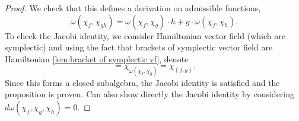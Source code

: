 \begin{proof}
    We check that this defines a derivation on admissible functions,
    \begin{equation}
        \omega(\chi_f, \chi_{gh}) = \omega(\chi_f, \chi_g)\cdot h + g \cdot \omega(\chi_f, \chi_h).
    \end{equation}
    To check the Jacobi identity, we consider Hamiltonian vector field (which are symplectic) and using the fact that brackets of symplectic vector field are Hamiltonian \cref{lem:bracket of symplectic vf}, denote
    \begin{equation}
        [\chi_f, \chi_g] = \chi_{\omega(\chi_f, \chi_g)} = \chi_{\left\{ f,g \right\}}.
    \end{equation}
    Since this forms a closed subalgebra, the Jacobi identity is satisfied and the proposition is proven. Can also show directly the Jacobi identity by considering
    $d \omega(\chi_f, \chi_g, \chi_h) = 0$.
\end{proof}
% 
\label{def:Isotropic presymplectic submanifold}
% 


